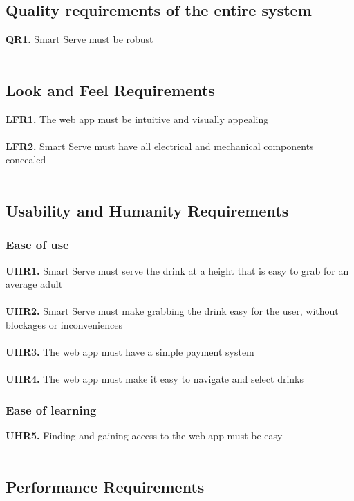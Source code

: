 \documentclass{article}
\begin{document}
\subsection{Quality requirements of the entire system}
    \noindent\textbf{QR1.} Smart Serve must be robust\\\\

\subsection{Look and Feel Requirements}
    \noindent\textbf{LFR1.} The web app must be intuitive and visually appealing \\\\
    \textbf{LFR2.} Smart Serve must have all electrical and mechanical components concealed \\\\

\subsection{Usability and Humanity Requirements}
    \subsubsection{Ease of use}
        \noindent\textbf{UHR1.} Smart Serve must serve the drink at a height that is easy to grab for an average adult \\\\
        \textbf{UHR2.} Smart Serve must make grabbing the drink easy for the user, without blockages or inconveniences\\\\
        \textbf{UHR3.} The web app must have a simple payment system\\\\
        \textbf{UHR4.} The web app must make it easy to navigate and select drinks\\
    \subsubsection{Ease of learning}
        \noindent\textbf{UHR5.} Finding and gaining access to the web app must be easy \\\\

\subsection{Performance Requirements}
\end{document}
